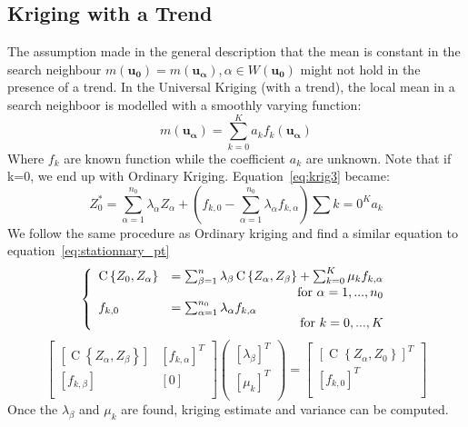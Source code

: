 \documentclass[twocolumn]{article}
\numberwithin{equation}{section}
\begin{document}
\subsection{Kriging with a Trend}
The assumption made in the general description that the mean is constant in the search neighbour $m(\boldsymbol{u_0}) = m(\boldsymbol{u_\alpha}) ,\alpha \in W(\boldsymbol{u_0})$ might not hold in the presence of a trend. In the Universal Kriging (with a trend), the local mean in a search neighboor is modelled with a smoothly varying function:
\[ m(\boldsymbol{u_\alpha})=\sum_{k=0}^K{a_k f_k(\boldsymbol{u_\alpha})}\]
Where $f_k$ are known function while the coefficient $a_k$ are unknown. Note that if k=0, we end up with Ordinary Kriging. Equation~\ref{eq:krig3} became:
\begin{equation}
	Z_0^* =  \sum_{\alpha=1}^{n_0}\lambda_\alpha Z_\alpha + \left( f_{k,0} - \sum_{\alpha=1}^{n_0} \lambda_\alpha f_{k,\alpha} \right) \sum{k=0}^K a_k
\end{equation}
We follow the same procedure as Ordinary kriging and find a similar equation to equation~\ref{eq:stationnary_pt}
\begin{equation} 
	\left\{
	\begin{array}{ll}
		\operatorname{C}\left\{Z_0, Z_\alpha \right\} &=  \sum_{\beta=1}^n \lambda_\beta \operatorname{C}\left\{Z_\alpha,Z_\beta\right\}
		  + \sum_{k=0}^K \mu_k f_{k,\alpha}  \\&\hfill \text{for } \alpha= 1,...,n_0\\
		f_{k,0} &= \sum_{\alpha=1}^{n_0} \lambda_\alpha f_{k,\alpha} \\& \hfill \text{for } k= 0,...,K\\
	\end{array}
	\right.
\end{equation}
\begin{equation}
		\begin{bmatrix}
       		[\operatorname{C}\left\{Z_\alpha,Z_\beta\right\}]	& [f_{k,\alpha}]^T	\\
       		[f_{k,\beta}]							& [0	]						\\
     	\end{bmatrix} 
     	\begin{pmatrix}
       		[\lambda_\beta]^T 	\\
       		[\mu_k]^T 		\\
     	\end{pmatrix}
     	=
     	\begin{bmatrix}
       		[\operatorname{C}\left\{Z_\alpha,Z_0\right\}]^T 	\\
       		[f_{k,0}]^T 					\\
     	\end{bmatrix}
\end{equation}
Once the $\lambda_\beta$ and $\mu_k$ are found, kriging estimate and variance can be computed.
\end{document}
